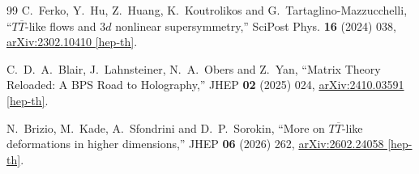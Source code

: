 \documentclass[a4paper,11pt]{article}
\numberwithin{equation}{section}
\begin{document}
\begin{thebibliography}{99}
C.~Ferko, Y.~Hu, Z.~Huang, K.~Koutrolikos and G.~Tartaglino-Mazzucchelli,
``$T\overline T$-like flows and $3d$ nonlinear supersymmetry,''
SciPost Phys. \textbf{16} (2024) 038,
\href{https://arxiv.org/abs/2302.10410}{arXiv:2302.10410 [hep-th]}.

C.~D.~A.~Blair, J.~Lahnsteiner, N.~A.~Obers and Z.~Yan,
``Matrix Theory Reloaded: A BPS Road to Holography,''
JHEP \textbf{02} (2025) 024,
\href{https://arxiv.org/abs/2410.03591}{arXiv:2410.03591 [hep-th]}.

N.~Brizio, M.~Kade, A.~Sfondrini and D.~P.~Sorokin,
``More on $T\overline T$-like deformations in higher dimensions,''
JHEP \textbf{06} (2026) 262,
\href{https://arxiv.org/abs/2602.24058}{arXiv:2602.24058 [hep-th]}.

\end{thebibliography}
\end{document}
